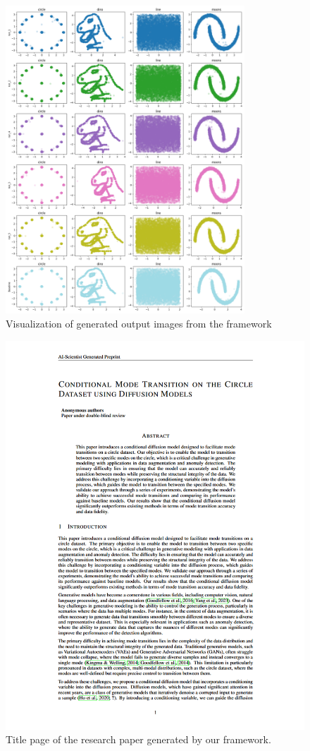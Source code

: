 \begin{figure}
    \centering
    \includegraphics[width=0.8\textwidth, height=0.7\textwidth]{images/generated_images.png}
    \caption{Visualization of generated output images from the framework}
    \label{fig:output_a} %
\end{figure}

\begin{figure}[ht]
    \centering
    \includegraphics[width=\textwidth, height=\textwidth]{images/1.png}
    \caption{Title page of the research paper generated by our framework.}
    \label{fig:output_e} %
\end{figure}
    
